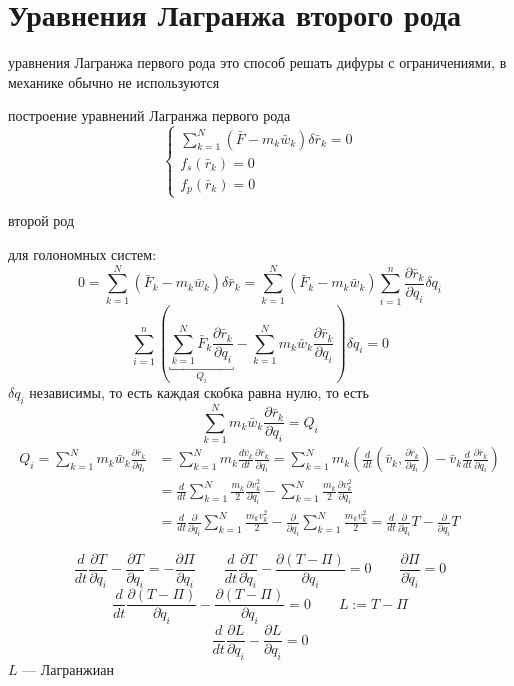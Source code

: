 \documentclass[crop=false]{standalone}
\begin{document}
\section{Уравнения Лагранжа второго рода}
\keypoint уравнения Лагранжа первого рода это способ решать дифуры с ограничениями, в механике обычно не используются

построение уравнений Лагранжа первого рода
\[
\begin{cases}
\sum_{k=1}^N (\bar F - m_k \bar w_k) \delta \bar r_k =0 \\ f_s(\bar r_k) = 0\\ f_p(\bar r_k) = 0
\end{cases}
\]

\noindent \keypoint второй род

для голономных систем:
\[0 = \sum_{k=1}^{N} (\bar F_k - m_k \bar w_k) \delta \bar r_k = \sum_{k=1}^{N} (\bar F_k - m_k \bar w_k) \sum_{i=1}^{n} \frac{\partial \bar r_k}{\partial q_i} \delta q_i \]
\[\sum_{i=1}^{n} \left( \underbracket{\sum_{k=1}^{N} \bar F_k \frac{\partial \bar r_k}{\partial q_i}}_{Q_i} -  \sum_{k=1}^{N} m_k \bar w_k \frac{\partial \bar r_k}{\partial q_i} \right) \delta q_i = 0\]
$\delta q_i$ независимы, то есть каждая скобка равна нулю, то есть
\[\sum_{k=1}^N m_k \bar w_k \frac{\partial \bar r_k}{\partial q_i} = Q_i\]
\[
\begin{aligned}
Q_i = \sum_{k=1}^N m_k \bar w_k \frac{\partial \bar r_k}{\partial q_i} &= \sum_{k=1}^{N} m_k \frac{d \bar v_k}{d t} \frac{\partial \bar r_k}{\partial q_i} = \sum_{k=1}^{N} m_k  \left( \frac{d}{d t} \left(\bar v_k, \frac{\partial \bar r_k}{\partial q_i}\right) - \bar v_k \frac{d}{d t} \frac{\partial \bar r_k}{\partial q_i} \right) \\
&= \frac{d}{d t} \sum_{k=1}^{N} \frac{m_k}{2} \frac{\partial v_k^2}{\partial \dot q_i} - \sum_{k=1}^{N} \frac{m_k}{2} \frac{\partial v_k^2}{\partial q_i} \\ &= \frac{d}{d t} \frac{\partial}{\partial \dot q_i}\sum_{k=1}^{N} \frac{m_k v_k^2}{2} - \frac{\partial}{\partial q_i} \sum_{k=1}^{N} \frac{m_k v_k^2}{2} = \frac{d}{d t} \frac{\partial}{\partial \dot q_i} T - \frac{\partial}{\partial q_i} T
\end{aligned}
\]

\[\frac{d}{d t} \frac{\partial T}{\partial \dot q_i} - \frac{\partial T}{\partial q_i} = - \frac{\partial \Pi}{\partial q_i} \qquad \frac{d}{d t} \frac{\partial T}{\partial \dot q_i} - \frac{\partial (T - \Pi)}{\partial q_i} =0 \qquad \frac{\partial \Pi}{\partial \dot q_i} = 0\]
\[\frac{d}{d t} \frac{\partial(T -\Pi)}{\partial \dot q_i} - \frac{\partial (T - \Pi)}{\partial q_i} =0 \qquad L := T - \Pi\]
\[\boxed{\frac{d}{d t} \frac{\partial L}{\partial \dot q_i} - \frac{\partial L}{\partial q_i} =0}\]
\Def $L$ — Лагранжиан
\end{document}

